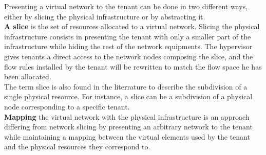 Presenting a virtual network to the tenant can be done in two different ways, either by slicing the physical infrastructure or by abstracting it.\\
\textbf{A slice} is the set of resources allocated to a virtual network.
Slicing the physical infrastructure consists in presenting the tenant with only a smaller part of the infrastructure while hiding the rest of the network equipments.
The hypervisor gives tenants a direct access to the network nodes composing the slice, and the flow rules installed by the tenant will be rewritten to match the flow space he has been allocated.\\
The term slice is also found in the literrature to describe the subdivision of a single physical resource. For instance, a slice can be a subdivision of a physical node corresponding to a specific tenant.\\
\textbf{Mapping} the virtual network with the physical infrastructure is an approach differing from network slicing by presenting an arbitrary network to the tenant while maintaining a mapping between the virtual elements used by the tenant and the physical resources they correspond to.


